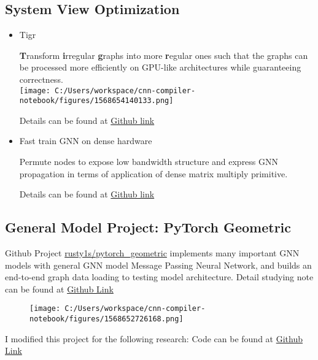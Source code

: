 \documentclass[]{article}
\begin{document}
\hypertarget{header-n1825}{%
\subsection{System View Optimization}\label{header-n1825}}

\begin{itemize}
\item
  Tigr

  \textbf{T}ransform \textbf{i}rregular \textbf{g}raphs into more
  \textbf{r}egular ones such that the graphs can be processed more
  efficiently on GPU-like architectures while guaranteeing
  correctness.\\
  \texttt{[image: C:/Users/workspace/cnn-compiler-notebook/figures/1568654140133.png]}

  Details can be found at
  \href{https://github.com/OrdinaryCrazy/cnn-compiler-notebook/blob/master/Studying\%20Note/tigr.md}{Github
  link}
\item
  Fast train GNN on dense hardware

  Permute nodes to expose low bandwidth structure and express GNN
  propagation in terms of application of dense matrix multiply
  primitive.

  Details can be found at
  \href{https://github.com/OrdinaryCrazy/cnn-compiler-notebook/blob/master/paper-reading-note/fast-training\%20of\%20sparse\%20gnn\%20on\%20dense\%20hardware.pdf}{Github
  link}
\end{itemize}

\hypertarget{header-n1832}{%
\subsection{General Model Project: PyTorch
Geometric}\label{header-n1832}}

Github Project
\href{https://github.com/rusty1s/pytorch_geometric}{rusty1s/pytorch\_geometric}
implements many important GNN models with general GNN model Message
Passing Neural Network, and builds an end-to-end graph data loading to
testing model architecture. Detail studying note can be found at
\href{https://github.com/OrdinaryCrazy/cnn-compiler-notebook/blob/master/Studying\%20Note/learn-pytorch-geometric.md}{Github
Link}

\begin{figure}
\centering
\texttt{[image: C:/Users/workspace/cnn-compiler-notebook/figures/1568652726168.png]}
\caption{}
\end{figure}

I modified this project for the following research: Code can be found at
\href{https://github.com/OrdinaryCrazy/cnn-compiler-notebook/tree/master/pytorch_geometric}{Github
Link}
\end{document}
